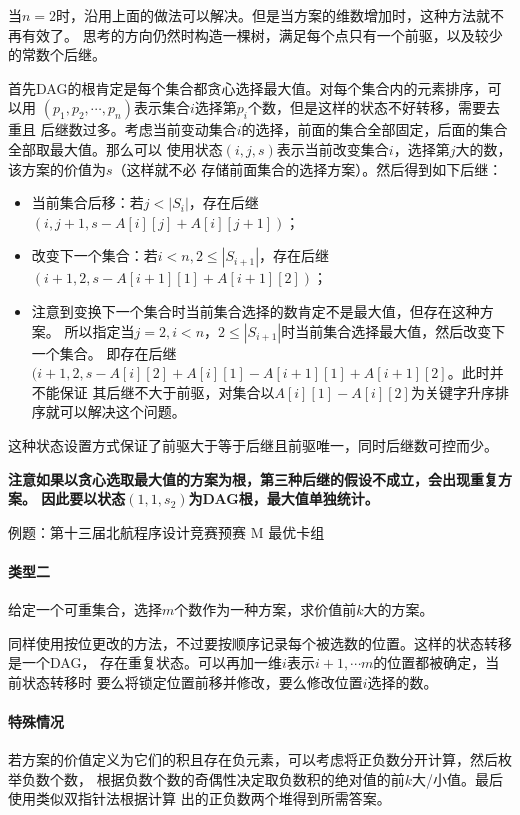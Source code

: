 当$n=2$时，沿用上面的做法可以解决。但是当方案的维数增加时，这种方法就不再有效了。
思考的方向仍然时构造一棵树，满足每个点只有一个前驱，以及较少的常数个后继。

首先DAG的根肯定是每个集合都贪心选择最大值。对每个集合内的元素排序，可以用
$(p_1,p_2,\cdots,p_n)$表示集合$i$选择第$p_i$个数，但是这样的状态不好转移，需要去重且
后继数过多。考虑当前变动集合$i$的选择，前面的集合全部固定，后面的集合全部取最大值。那么可以
使用状态$(i,j,s)$表示当前改变集合$i$，选择第$j$大的数，该方案的价值为$s$（这样就不必
存储前面集合的选择方案）。然后得到如下后继：
\begin{itemize}
	\item 当前集合后移：若$j<|S_i|$，存在后继$(i,j+1,s-A[i][j]+A[i][j+1])$；
	\item 改变下一个集合：若$i<n,2\leq |S_{i+1}|$，存在后继
	$(i+1,2,s-A[i+1][1]+A[i+1][2])$；
	\item 注意到变换下一个集合时当前集合选择的数肯定不是最大值，但存在这种方案。
	所以指定当$j=2,i<n，2\leq |S_{i+1}|$时当前集合选择最大值，然后改变下一个集合。
	即存在后继$(i+1,2,s-A[i][2]+A[i][1]-A[i+1][1]+A[i+1][2]$。此时并不能保证
	其后继不大于前驱，对集合以$A[i][1]-A[i][2]$为关键字升序排序就可以解决这个问题。
\end{itemize}

这种状态设置方式保证了前驱大于等于后继且前驱唯一，同时后继数可控而少。

{\bfseries 注意如果以贪心选取最大值的方案为根，第三种后继的假设不成立，会出现重复方案。
因此要以状态$(1,1,s_2)$为DAG根，最大值单独统计。}

例题：第十三届北航程序设计竞赛预赛 M 最优卡组


\paragraph{类型二}
给定一个可重集合，选择$m$个数作为一种方案，求价值前$k$大的方案。

同样使用按位更改的方法，不过要按顺序记录每个被选数的位置。这样的状态转移是一个DAG，
存在重复状态。可以再加一维$i$表示$i+1,\cdots m$的位置都被确定，当前状态转移时
要么将锁定位置前移并修改，要么修改位置$i$选择的数。

\paragraph{特殊情况}
若方案的价值定义为它们的积且存在负元素，可以考虑将正负数分开计算，然后枚举负数个数，
根据负数个数的奇偶性决定取负数积的绝对值的前$k$大/小值。最后使用类似双指针法根据计算
出的正负数两个堆得到所需答案。

